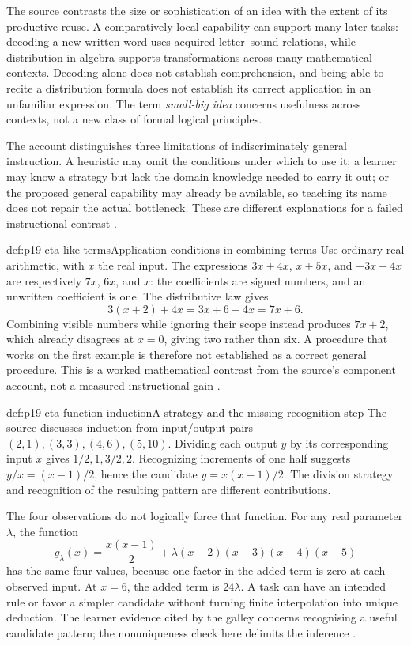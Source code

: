 The source contrasts the size or sophistication of an idea with the
extent of its productive reuse. A comparatively local capability can
support many later tasks: decoding a new written word uses acquired
letter--sound relations, while distribution in algebra supports
transformations across many mathematical contexts. Decoding alone does
not establish comprehension, and being able to recite a distribution
formula does not establish its correct application in an unfamiliar
expression. The term \emph{small-big idea} concerns usefulness across
contexts, not a new class of formal logical principles.

The account distinguishes three limitations of indiscriminately general
instruction. A heuristic may omit the conditions under which to use it;
a learner may know a strategy but lack the domain knowledge needed to
carry it out; or the proposed general capability may already be available,
so teaching its name does not repair the actual bottleneck. These are
different explanations for a failed instructional contrast
\cite[galley pp.~701--703]{KoedingerRoll2011TransferTypeset}.

\begin{hbexample}{def:p19-cta-like-terms}{Application conditions in combining terms}
Use ordinary real arithmetic, with \(x\) the real input. The expressions
\(3x+4x\), \(x+5x\), and \(-3x+4x\) are respectively
\(7x\), \(6x\), and \(x\): the coefficients are signed numbers,
and an unwritten coefficient is one. The distributive law gives
\[
 3(x+2)+4x=3x+6+4x=7x+6.
\]
Combining visible numbers while ignoring their scope instead produces
\(7x+2\), which already disagrees at \(x=0\), giving two rather
than six. A procedure that works on the first example is therefore not
established as a correct general procedure. This is a worked mathematical
contrast from the source's component account, not a measured instructional
gain \cite[galley p.~701]{KoedingerRoll2011TransferTypeset}.
\end{hbexample}

\begin{hbexample}{def:p19-cta-function-induction}{A strategy and the missing recognition step}
The source discusses induction from input/output pairs
\((2,1),(3,3),(4,6),(5,10)\). Dividing each output \(y\) by
its corresponding input \(x\) gives \(1/2,1,3/2,2\).
Recognizing increments of one half suggests
\(y/x=(x-1)/2\), hence the candidate \(y=x(x-1)/2\).
The division strategy and recognition of the resulting pattern are
different contributions.

The four observations do not logically force that function. For any
real parameter \(\lambda\), the function
\[
 g_\lambda(x)=\frac{x(x-1)}2+
       \lambda(x-2)(x-3)(x-4)(x-5)
\]
has the same four values, because one factor in the added term is zero
at each observed input. At \(x=6\), the added term is
\(24\lambda\). A task can have an intended rule or favor a simpler
candidate without turning finite interpolation into unique deduction.
The learner evidence cited by the galley concerns recognising a useful
candidate pattern; the nonuniqueness check here delimits the inference
\cite[galley p.~702]{KoedingerRoll2011TransferTypeset}.
\end{hbexample}

